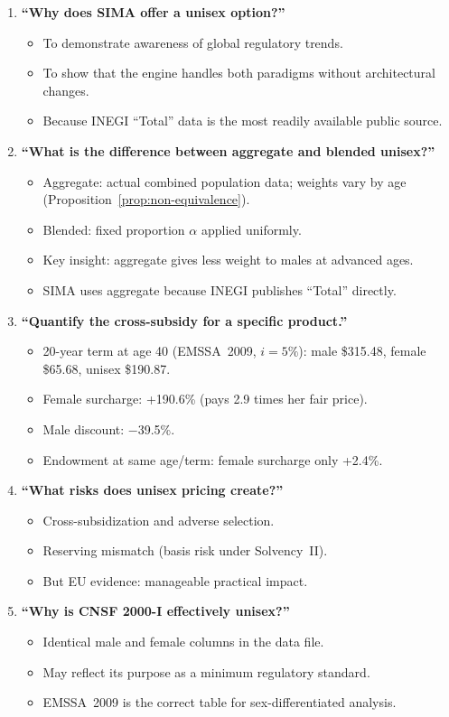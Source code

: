 \documentclass[12pt,a4paper]{article}
\begin{document}
\begin{enumerate}
  \item \textbf{``Why does SIMA offer a unisex option?''}
  \begin{itemize}
    \item To demonstrate awareness of global regulatory trends.
    \item To show that the engine handles both paradigms without architectural changes.
    \item Because INEGI ``Total'' data is the most readily available public source.
  \end{itemize}

  \item \textbf{``What is the difference between aggregate and blended unisex?''}
  \begin{itemize}
    \item Aggregate: actual combined population data; weights vary by age
          (Proposition~\ref{prop:non-equivalence}).
    \item Blended: fixed proportion $\alpha$ applied uniformly.
    \item Key insight: aggregate gives less weight to males at advanced ages.
    \item SIMA uses aggregate because INEGI publishes ``Total'' directly.
  \end{itemize}

  \item \textbf{``Quantify the cross-subsidy for a specific product.''}
  \begin{itemize}
    \item 20-year term at age 40 (EMSSA~2009, $i = 5\%$): male \$315.48,
          female \$65.68, unisex \$190.87.
    \item Female surcharge: +190.6\% (pays 2.9 times her fair price).
    \item Male discount: $-$39.5\%.
    \item Endowment at same age/term: female surcharge only +2.4\%.
  \end{itemize}

  \item \textbf{``What risks does unisex pricing create?''}
  \begin{itemize}
    \item Cross-subsidization and adverse selection.
    \item Reserving mismatch (basis risk under Solvency~II).
    \item But EU evidence: manageable practical impact.
  \end{itemize}

  \item \textbf{``Why is CNSF 2000-I effectively unisex?''}
  \begin{itemize}
    \item Identical male and female columns in the data file.
    \item May reflect its purpose as a minimum regulatory standard.
    \item EMSSA~2009 is the correct table for sex-differentiated analysis.
  \end{itemize}
\end{enumerate}
\end{document}

